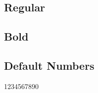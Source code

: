 \documentclass{article}
\begin{document}
\subsection*{Regular}
\lipsum[1]


\subsection*{Bold}

\textbf{\lipsum[2]}

\subsection*{Default Numbers}

1234567890
\end{document}
